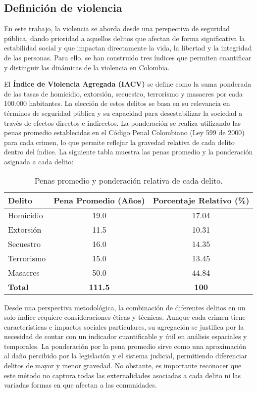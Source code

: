 \subsection*{Definición de violencia}

En este trabajo, la violencia se aborda desde una perspectiva de seguridad pública, dando prioridad a aquellos delitos que afectan de forma significativa la estabilidad social y que impactan directamente la vida, la libertad y la integridad de las personas. Para ello, se han construido tres índices que permiten cuantificar y distinguir las dinámicas de la violencia en Colombia.

El \textbf{Índice de Violencia Agregada (IACV)} se define como la suma ponderada de las tasas de homicidio, extorsión, secuestro, terrorismo y masacres por cada 100.000 habitantes. La elección de estos delitos se basa en su relevancia en términos de seguridad pública y su capacidad para desestabilizar la sociedad a través de efectos directos e indirectos. La ponderación se realiza utilizando las penas promedio establecidas en el Código Penal Colombiano (Ley 599 de 2000) para cada crimen, lo que permite reflejar la gravedad relativa de cada delito dentro del índice. La siguiente tabla muestra las penas promedio y la ponderación asignada a cada delito:

\begin{table}[h]
\centering
\begin{tabular}{lcc}
\hline
\textbf{Delito} & \textbf{Pena Promedio (Años)} & \textbf{Porcentaje Relativo (\%)} \\
\hline
Homicidio     & 19.0 & 17.04 \\
Extorsión     & 11.5 & 10.31 \\
Secuestro     & 16.0 & 14.35 \\
Terrorismo    & 15.0 & 13.45 \\
Masacres      & 50.0 & 44.84 \\
\hline
\textbf{Total} & \textbf{111.5} & \textbf{100} \\
\hline
\end{tabular}
\caption{Penas promedio y ponderación relativa de cada delito.}
\label{tab:pena}
\end{table}

Desde una perspectiva metodológica, la combinación de diferentes delitos en un solo índice requiere consideraciones éticas y técnicas. Aunque cada crimen tiene características e impactos sociales particulares, su agregación se justifica por la necesidad de contar con un indicador cuantificable y útil en análisis espaciales y temporales. La ponderación por la pena promedio sirve como una aproximación al daño percibido por la legislación y el sistema judicial, permitiendo diferenciar delitos de mayor y menor gravedad. No obstante, es importante reconocer que este método no captura todas las externalidades asociadas a cada delito ni las variadas formas en que afectan a las comunidades.

